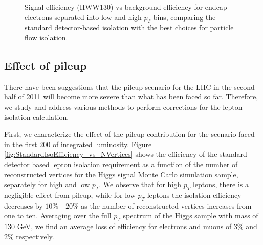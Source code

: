 \begin{figure}[!htbp]
\begin{center}
\caption{Signal efficiency (HWW130) vs background efficiency for endcap electrons separated into 
low and high $p_{T}$ bins, comparing the standard detector-based isolation with the best choices 
for particle flow isolation.}
\label{fig:Electron_PFIso_BestLowPU_Endcap}
\end{center}
\end{figure}




\subsection{Effect of pileup}

There have been suggestions that the pileup scenario for the LHC in the 
second half of 2011 will become more severe than what has been faced so far.
Therefore, we study and address various methods to perform corrections
for the lepton isolation calculation. 

First, we characterize the effect of the pileup contribution for the 
scenario faced in the first $200$ \ipb of integrated luminosity.  
Figure \ref{fig:StandardIsoEfficiency_vs_NVertices} shows the 
efficiency of the standard detector based lepton isolation requirement 
as a function of the number of reconstructed vertices for the 
Higgs signal Monte Carlo simulation sample, separately for high 
and low $p_{T}$. We observe that for high $p_{T}$ leptons, there is a 
negligible effect from pileup, while for low $p_{T}$ leptons the 
isolation efficiency decreases by $10\%$ - $20\%$ as the number
of reconstructed vertices increases from one to ten. Averaging 
over the full $p_{T}$ spectrum of the Higgs sample with mass of
$130$ GeV, we find an average loss of efficiency for electrons and
muons of  $3\%$ and $2\%$ respectively. 

